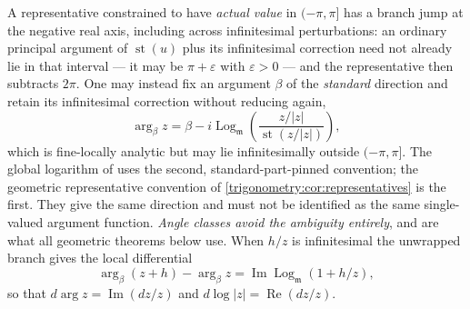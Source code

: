 \documentclass[11pt,letterpaper]{article}
\numberwithin{equation}{section}
\theoremstyle{definition}
\theoremstyle{remark}
\newcommand{\mm}{\mathfrak m}
\newcommand{\eps}{\varepsilon}
\newcommand{\st}{\operatorname{st}}
\newcommand{\re}{\operatorname{Re}}
\newcommand{\im}{\operatorname{Im}}
\newcommand{\Logm}{\operatorname{Log}_{\mm}}
\begin{document}
\begin{remark}\label{trigonometry:rem:cut}
A representative constrained to have \emph{actual value} in $(-\pi,\pi]$ has a branch jump at the
negative real axis, including across infinitesimal perturbations: an ordinary principal argument of
$\st(u)$ plus its infinitesimal correction need not already lie in that interval --- it may be
$\pi+\eps$ with $\eps>0$ --- and the representative then subtracts $2\pi$. One may instead fix an
argument $\beta$ of the \emph{standard} direction and retain its infinitesimal correction without
reducing again,
\begin{equation}\label{trigonometry:eq:unwrap}
 \arg_\beta z=\beta-i\Logm\!\left(\frac{z/|z|}{\st(z/|z|)}\right),
\end{equation}
which is fine-locally analytic but may lie infinitesimally outside $(-\pi,\pi]$. The global
logarithm of \cite{SourceAnalysis} uses the second, standard-part-pinned convention; the geometric
representative convention of \cref{trigonometry:cor:representatives} is the first. They give the
same direction and must not be identified as the same single-valued argument function.
\emph{Angle classes avoid the ambiguity entirely}, and are what all geometric theorems below use.
When $h/z$ is infinitesimal the unwrapped branch gives the local differential
\begin{equation}\label{trigonometry:eq:argdiff}
 \arg_\beta(z+h)-\arg_\beta z=\im\Logm(1+h/z),
\end{equation}
so that $d\arg z=\im(dz/z)$ and $d\log|z|=\re(dz/z)$.
\end{remark}
\end{document}
